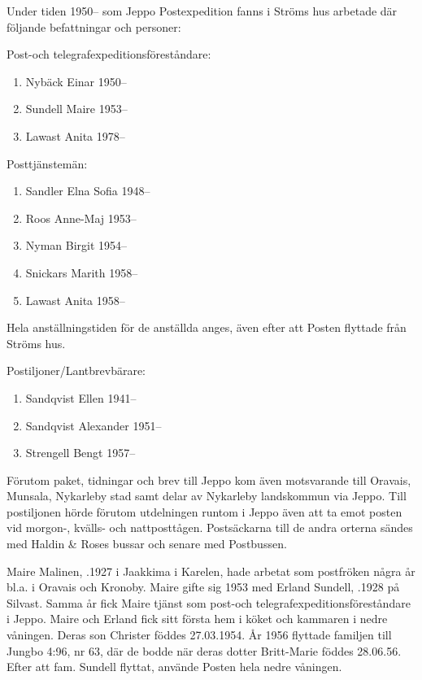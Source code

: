 Under tiden 1950-- som Jeppo Postexpedition fanns i Ströms hus arbetade där följande befattningar och personer:

Post-och telegrafexpeditionsföreståndare:
\begin{enumerate}
  \item Nybäck Einar   1950--
  \item Sundell Maire   1953--
  \item Lawast Anita    1978--
\end{enumerate}

Posttjänstemän:
\begin{enumerate}
  \item Sandler Elna Sofia      1948--
  \item Roos Anne-Maj	          1953--
  \item Nyman Birgit            1954--
  \item Snickars Marith	        1958--
  \item Lawast Anita            1958--
\end{enumerate}
Hela anställningstiden för de anställda anges, även efter att Posten flyttade från Ströms hus.

Postiljoner/Lantbrevbärare:
\begin{enumerate}
  \item Sandqvist Ellen     1941--
  \item Sandqvist Alexander 1951--
  \item Strengell Bengt     1957--
\end{enumerate}
Förutom paket, tidningar och brev till Jeppo kom även motsvarande till Oravais, Munsala, Nykarleby stad samt delar av Nykarleby landskommun via Jeppo. Till postiljonen hörde förutom utdelningen runtom i Jeppo även att ta emot posten vid morgon-, kvälls- och nattposttågen. Postsäckarna till de andra orterna sändes med Haldin \& Roses bussar och senare med Postbussen.

Maire Malinen, .1927 i Jaakkima i Karelen, hade arbetat som postfröken några år bl.a. i Oravais och Kronoby. Maire gifte sig 1953	med Erland Sundell, .1928 på Silvast. Samma år fick Maire tjänst som post-och telegrafexpeditionsföreståndare i Jeppo. Maire och Erland fick sitt första hem i köket och kammaren i nedre våningen. Deras son Christer föddes 27.03.1954. År 1956 flyttade familjen till Jungbo	4:96, nr 63, där de bodde när deras dotter Britt-Marie föddes 28.06.56.	Efter att fam. Sundell flyttat, använde Posten hela nedre våningen.


